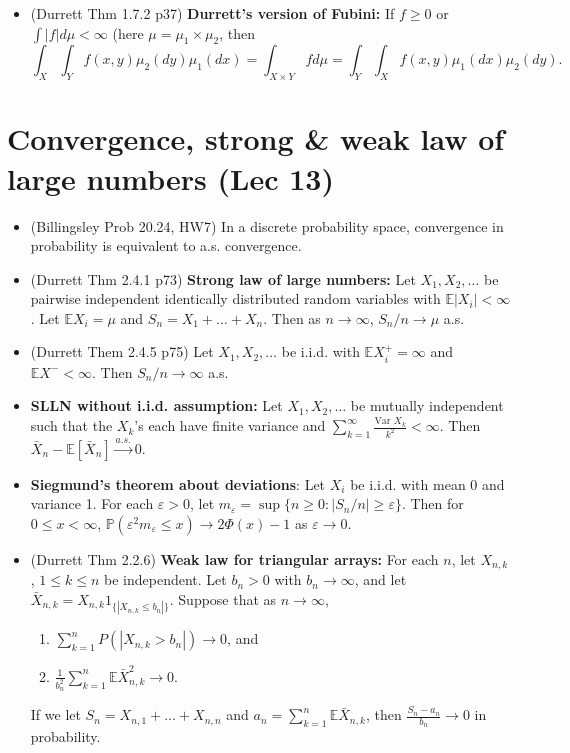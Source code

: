 \documentclass[twoside]{article}
\newcommand{\dis}{\displaystyle}
\newcommand\bbE{\mathbb{E}}
\newcommand\bbP{\mathbb{P}}
\def\eps{\varepsilon}
\newcommand\goesto{\rightarrow}
\newcommand\var{\text{Var }}
\begin{document}
\begin{itemize}
\item (Durrett Thm 1.7.2 p37) \textbf{Durrett's version of Fubini:} If $f \geq 0$ or $\dis\int |f| d\mu < \infty$ (here $\mu = \mu_1 \times \mu_2$, then
\begin{equation*}
\int_X \int_Y f(x,y) \mu_2(dy) \mu_1(dx) = \int_{X \times Y} f d\mu = \int_Y \int_X f(x,y) \mu_1 (dx) \mu_2 (dy).
\end{equation*}


\end{itemize}

\section*{Convergence, strong \& weak law of large numbers (Lec 13)}
\begin{itemize}
\item (Billingsley Prob 20.24, HW7) In a discrete probability space, convergence in probability is equivalent to a.s. convergence.

\item (Durrett Thm 2.4.1 p73) \textbf{Strong law of large numbers:} Let $X_1, X_2, \dots$ be pairwise independent identically distributed random variables with $\bbE |X_i| < \infty$. Let $\bbE X_i = \mu$ and $S_n = X_1 + \dots + X_n$. Then as $n \goesto \infty$, $S_n / n \goesto \mu$ a.s.

\item (Durrett Them 2.4.5 p75) Let $X_1, X_2, \dots$ be i.i.d. with $\bbE X_i^+ = \infty$ and $\bbE X^- < \infty$. Then $S_n/n \goesto \infty$ a.s.

\item \textbf{SLLN without i.i.d. assumption:} Let $X_1, X_2, \dots$ be mutually independent such that the $X_k$'s each have finite variance and $\dis\sum_{k=1}^\infty\frac{\var X_k}{k^2} < \infty$. Then $\bar{X}_n - \bbE [\bar{X}_n] \stackrel{a.s.}{\goesto} 0$.

\item \textbf{Siegmund's theorem about deviations}: Let $X_i$ be i.i.d. with mean 0 and variance 1. For each $\eps > 0$, let $m_\eps = \sup \{ n \geq 0: |S_n / n| \geq \eps \}$. Then for $0 \leq x < \infty$, $\bbP (\eps^2 m_\eps \leq x) \goesto 2\Phi(x) - 1$ as $\eps \goesto 0$.

\item (Durrett Thm 2.2.6) \textbf{Weak law for triangular arrays:} For each $n$, let $X_{n,k}$, $1 \leq k \leq n$ be independent. Let $b_n > 0$ with $b_n \goesto \infty$, and let $\bar{X}_{n,k} = X_{n,k} 1_{\{ |X_{n,k} \leq b_n|\}}$. Suppose that as $n \goesto \infty$,
\begin{enumerate}
\item $\dis\sum_{k=1}^n P(|X_{n,k} > b_n|) \goesto 0$, and
\item $\dis\frac{1}{b_n^2}\sum_{k=1}^n \bbE \bar{X}_{n,k}^2 \goesto 0$.
\end{enumerate}
If we let $S_n = X_{n,1} + \dots + X_{n,n}$ and $a_n = \dis\sum_{k=1}^n \bbE \bar{X}_{n,k}$, then $\dis\frac{S_n - a_n}{b_n} \goesto 0$ in probability.


\end{itemize}
\end{document}
